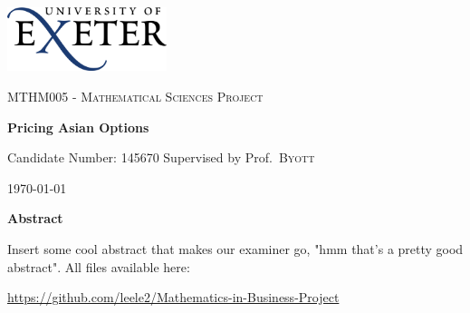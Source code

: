 \begin{titlepage}
	\centering
	\includegraphics[width=0.35\textwidth]{Title/logo.png} \par
	\vspace{0.25cm}
	{\scshape\Large MTHM005 - Mathematical Sciences Project\par}
	\vspace{0.5cm}
	{\huge\bfseries Pricing Asian Options\par}
    \vspace{0.10cm}
	{\Large Candidate Number: 145670}
	\vspace{0.2cm}
	\flushleft
	Supervised by	Prof.~\textsc{Byott} \hfill	{\large \today\par}
    \par
    \centering
	{\large \textbf{Abstract}}
	\par
    \lipsum[1]
    Insert some cool abstract that makes our examiner go, "hmm that's a pretty good abstract".
    \vfill
    All files available here: \par \small{\url{https://github.com/leele2/Mathematics-in-Business-Project}}
\end{titlepage}